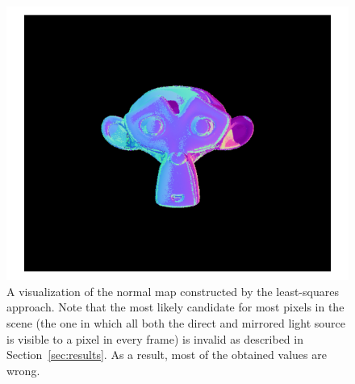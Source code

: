 \begin{figure}
  \includegraphics[width=\columnwidth]{images/output-combined}
  \caption{A visualization of the normal map constructed by the least-squares
  approach. Note that the most likely candidate for most pixels in the scene
  (the one in which all both the direct and mirrored light source is visible to
  a pixel in every frame) is invalid as described in Section~\ref{sec:results}.
  As a result, most of the obtained values are
  wrong.}\label{fig:output-combined}
\end{figure}

